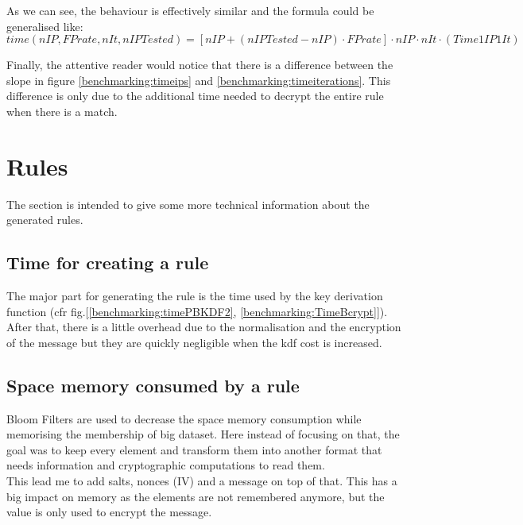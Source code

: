\documentclass{eplmastersthesis}
\begin{document}
As we can see, the behaviour is effectively similar and the formula could be generalised like:
$$time(nIP, FPrate, nIt, nIPTested)=\left[nIP+(nIPTested-nIP) \cdot FPrate\right] \cdot nIP \cdot nIt \cdot (Time1IP1It)$$

Finally, the attentive reader would notice that there is a difference between the slope in figure \ref{benchmarking:timeips} and \ref{benchmarking:timeiterations}. This difference is only due to the additional time needed to decrypt the entire rule when there is a match.

\section{Rules}

The section is intended to give some more technical information about the generated rules.

\subsection{Time for creating a rule}
The major part for generating the rule is the time used by the key derivation function (cfr fig.[\ref{benchmarking:timePBKDF2}, \ref{benchmarking:TimeBcrypt}]). After that, there is a little overhead due to the normalisation and the encryption of the message but they are quickly negligible when the \gls{kdf} cost is increased.\\

\subsection{Space memory consumed by a rule}
Bloom Filters are used to decrease the space memory consumption while memorising the membership of big dataset. Here instead of focusing on that, the goal was to keep every element and transform them into another format that needs information and cryptographic computations to read them.\\

This lead me to add salts, nonces (IV) and a message on top of that. This has a big impact on memory as the elements are not remembered anymore, but the value is only used to encrypt the message.\\
\end{document}

